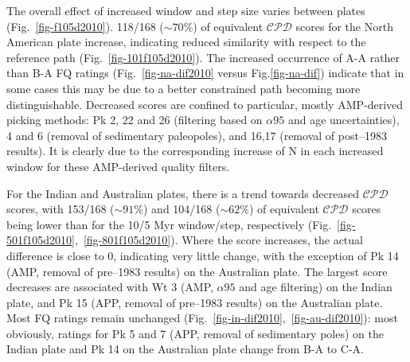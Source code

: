 The overall effect of increased window and step size varies between plates
(Fig.~\ref{fig-f105d2010}). 118/168 (${\sim}70$\%) of equivalent $\mathcal{CPD}$
scores for the North American plate increase, indicating reduced similarity with
respect to the reference path (Fig.~\ref{fig-101f105d2010}). The increased
occurrence of A-A rather than B-A FQ ratings (Fig.~\ref{fig-na-dif2010} versus
Fig.\ref{fig-na-dif}) indicate that in some cases this may be due to a better
constrained path becoming more distinguishable. Decreased scores are confined to
particular, mostly AMP-derived picking methods: Pk 2, 22 and 26 (filtering based
on ${\alpha}95$ and age uncertainties), 4 and 6 (removal of sedimentary
paleopoles), and 16,17 (removal of post–1983 results). It is clearly due to the
corresponding increase of N in each increased window for these AMP-derived
quality filters.

For the Indian and Australian plates, there is a trend towards decreased
$\mathcal{CPD}$ scores, with 153/168 (${\sim}91$\%) and 104/168 (${\sim}62$\%)
of equivalent $\mathcal{CPD}$ scores being lower than for the 10/5 Myr
window/step, respectively (Fig.~\ref{fig-501f105d2010},~\ref{fig-801f105d2010}).
Where the score increases, the actual difference is close to 0, indicating very
little change, with the exception of Pk 14 (AMP, removal of pre–1983 results) on
the Australian plate. The largest score decreases are associated with Wt 3 (AMP,
${\alpha}95$ and age filtering) on the Indian plate, and Pk 15 (APP, removal of
pre–1983 results) on the Australian plate. Most FQ ratings remain unchanged
(Fig.~\ref{fig-in-dif2010},~\ref{fig-au-dif2010}): most obviously, ratings for
Pk 5 and 7 (APP, removal of sedimentary poles) on the Indian plate and Pk 14 on
the Australian plate change from B-A to C-A.

